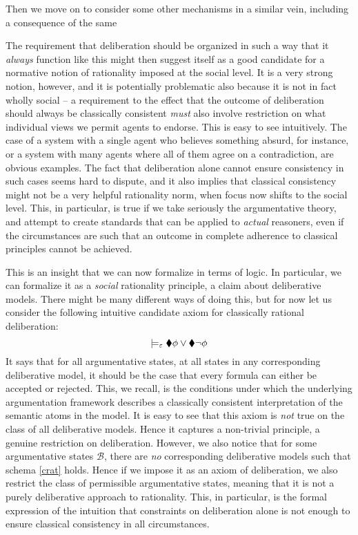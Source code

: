 \documentclass[greybox]{svmult}
\newcommand{\views}{\mathcal B}
\newcommand{\sem}{\varepsilon}
\begin{document}
Then we move on to consider some other mechanisms in a similar vein, including a consequence of the same 


The requirement that deliberation should be organized in such a way that it \emph{always} function like this might then suggest itself as a good candidate for a normative notion of rationality imposed at the social level. It is a very strong notion, however, and it is potentially problematic also because it is not in fact wholly social -- a requirement to the effect that the outcome of deliberation should always be classically consistent \emph{must} also involve restriction on what individual views we permit agents to endorse. This is easy to see intuitively. The case of a system with a single agent who believes something absurd, for instance, or a system with many agents where all of them agree on a contradiction, are obvious examples. The fact that deliberation alone cannot ensure consistency in such cases seems hard to dispute, and it also implies that classical consistency might not be a very helpful rationality norm, when focus now shifts to the social level. This, in particular, is true if we take seriously the argumentative theory, and attempt to create standards that can be applied to \emph{actual} reasoners, even if the circumstances are such that an outcome in complete adherence to classical principles cannot be achieved.

This is an insight that we can now formalize in terms of logic. In particular, we can formalize it as a \emph{social} rationality principle, a claim about deliberative models. There might be many different ways of doing this, but for now let us consider the following intuitive candidate axiom for classically rational deliberation:
\begin{equation}\label{crat}
\models_\sem \cdia \phi \lor \cdia \neg \phi
\end{equation}
It says that for all argumentative states, at all states in any corresponding deliberative model, it should be the case that every formula can either be accepted or rejected. This, we recall, is the conditions under which the underlying argumentation framework describes a classically consistent interpretation of the semantic atoms in the model. It is easy to see that this axiom is \emph{not} true on the class of all deliberative models. Hence it captures a non-trivial principle, a genuine restriction on deliberation. However, we also notice that for some argumentative states $\views$, there are \emph{no} corresponding deliberative models such that schema \ref{crat} holds. Hence if we impose it as an axiom of deliberation, we also restrict the class of permissible argumentative states, meaning that it is not a purely deliberative approach to rationality. This, in particular, is the formal expression of the intuition that constraints on deliberation alone is not enough to ensure classical consistency in all circumstances. 
\end{document}
